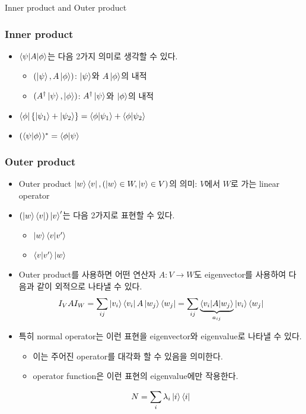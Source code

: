 \documentclass[9pt]{beamer}
\begin{document}
    \begin{section}{Inner product and Outer product}
        \begin{frame}
            \frametitle{Inner product}
            \begin{itemize}
                \item $\braket{\psi | A | \phi}$는 다음 2가지 의미로 생각할 수 있다.
                \begin{itemize}
                    \item $(\ket \psi, A \ket \phi)$: $\ket \psi$와 $A \ket \phi$의 내적
                    \item $(A^\dagger \ket \psi, \ket \phi)$: $A^\dagger \ket \psi$와 $\ket \phi$의 내적
                \end{itemize}
                \item $\bra \phi \{ \ket{\psi_1} + \ket{\psi_2}\} = \braket{\phi|\psi_1} + \braket{\phi|\psi_2}$
                \item $(\braket{\psi|\phi})^\ast = \braket{\phi | \psi}$
            \end{itemize}
        \end{frame}

        \begin{frame}
            \frametitle{Outer product}
            \begin{itemize}
                \item Outer product $\ket w \bra v, (\ket w \in W, \ket v \in V)$의 의미: $V$에서 $W$로 가는 linear operator 
                \item $(\ket w \bra v) \ket v'$는 다음 2가지로 표현할 수 있다.
                \begin{itemize}
                    \item $\ket w \braket{v| v'}$
                    \item $\braket{v| v'} \ket w $
                \end{itemize}
                \item Outer product를 사용하면 어떤 연산자 $A: V \rightarrow W$도 eigenvector를 사용하여 다음과 같이 외적으로 나타낼 수 있다.
                $$ I_V A I_W = \sum_{ij} \ket {v_i} \bra {v_i} A \ket {w_j} \bra {w_j} = \sum_{ij} \underbrace{\braket{v_i|A|w_j}}_{a_{ij}} \ket{v_i} \bra{w_j}$$
                \item 특히 normal operator는 이런 표현을 eigenvector와 eigenvalue로 나타낼 수 있다.
                \begin{itemize}
                    \item 이는 주어진 operator를 대각화 할 수 있음을 의미한다.
                    \item operator function은 이런 표현의 eigenvalue에만 작용한다.
                \end{itemize}
                $$ N = \sum_{i} \lambda_i \ket i \bra i$$
                
            \end{itemize}
        \end{frame}
    \end{section}
    
\end{document}
